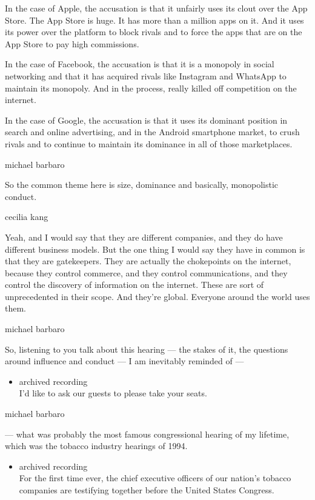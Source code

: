In the case of Apple, the accusation is that it unfairly uses its clout
over the App Store. The App Store is huge. It has more than a million
apps on it. And it uses its power over the platform to block rivals and
to force the apps that are on the App Store to pay high commissions.

In the case of Facebook, the accusation is that it is a monopoly in
social networking and that it has acquired rivals like Instagram and
WhatsApp to maintain its monopoly. And in the process, really killed off
competition on the internet.

In the case of Google, the accusation is that it uses its dominant
position in search and online advertising, and in the Android smartphone
market, to crush rivals and to continue to maintain its dominance in all
of those marketplaces.

michael barbaro

So the common theme here is size, dominance and basically, monopolistic
conduct.

cecilia kang

Yeah, and I would say that they are different companies, and they do
have different business models. But the one thing I would say they have
in common is that they are gatekeepers. They are actually the
chokepoints on the internet, because they control commerce, and they
control communications, and they control the discovery of information on
the internet. These are sort of unprecedented in their scope. And
they're global. Everyone around the world uses them.

michael barbaro

So, listening to you talk about this hearing --- the stakes of it, the
questions around influence and conduct --- I am inevitably reminded of
---

\begin{itemize}
\tightlist
\item
  archived recording\\
  I'd like to ask our guests to please take your seats.
\end{itemize}

michael barbaro

--- what was probably the most famous congressional hearing of my
lifetime, which was the tobacco industry hearings of 1994.

\begin{itemize}
\tightlist
\item
  archived recording\\
  For the first time ever, the chief executive officers of our nation's
  tobacco companies are testifying together before the United States
  Congress.
\end{itemize}

